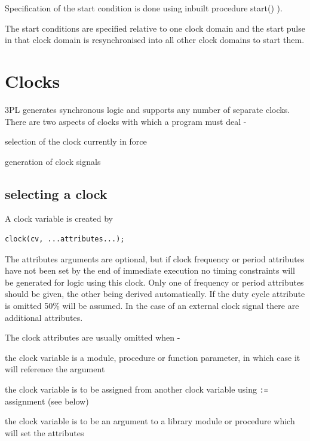             Specification of the start condition is done using inbuilt
            procedure start() ).
            
            The start conditions are specified relative to one clock domain and
            the start pulse in that clock domain is resynchronised into all other
            clock domains to start them.            


    \section{Clocks}

        3PL generates synchronous logic and supports any number of separate
        clocks. There are two aspects of clocks with which a program must
        deal -
        \blist
        \item   selection of the clock currently in force
        \item   generation of clock signals
        \blend

        \subsection{selecting a clock}

            A clock variable is created by
            \begin{lstlisting}[gobble=12, language=threepl]
               clock(cv, ...attributes...);
            \end{lstlisting}
            The attributes arguments are optional, but if clock frequency or
            period attributes have not been set by the end of immediate execution no
            timing constraints will be generated for logic using this clock.
            Only one of frequency or period attributes should be given, the other
            being derived automatically. If the duty cycle attribute is omitted 50\% will
            be assumed. In the case of an external clock signal there are
            additional attributes.
            
            The clock attributes are usually omitted when -
            \blist
            \item   the clock variable is a module, procedure or function
                    parameter, in which case it will reference the argument
            \item   the clock variable is to be assigned from another clock
                    variable using \verb':=' assignment (see below)
            \item   the clock variable is to be an argument to a library
                    module or procedure which will set the attributes
            \blend
            
